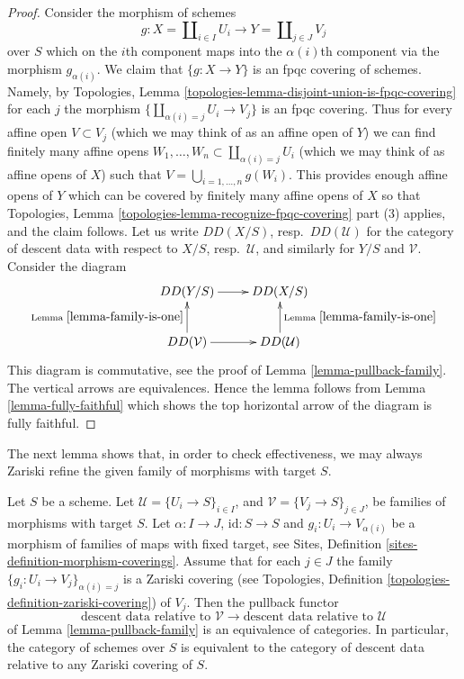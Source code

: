 \begin{proof}
Consider the morphism of schemes
$$
g :
X = \coprod\nolimits_{i \in I} U_i
\longrightarrow
Y = \coprod\nolimits_{j \in J} V_j
$$
over $S$ which on the $i$th component maps into the $\alpha(i)$th component
via the morphism $g_{\alpha(i)}$. We claim that $\{g : X \to Y\}$
is an fpqc covering of schemes. Namely, by
Topologies, Lemma \ref{topologies-lemma-disjoint-union-is-fpqc-covering}
for each $j$ the morphism $\{\coprod_{\alpha(i) = j} U_i \to V_j\}$ is an
fpqc covering. Thus for every affine open $V \subset V_j$
(which we may think of as an affine open of $Y$)
we can find finitely many affine opens
$W_1, \ldots, W_n \subset \coprod_{\alpha(i) = j} U_i$
(which we may think of as affine opens of $X$)
such that $V = \bigcup_{i = 1, \ldots, n} g(W_i)$.
This provides enough affine opens of $Y$ which can be covered by finitely
many affine opens of $X$ so that
Topologies, Lemma \ref{topologies-lemma-recognize-fpqc-covering} part (3)
applies, and the claim follows. Let us write $DD(X/S)$,
resp.\ $DD(\mathcal{U})$ for the category of descent data with respect
to $X/S$, resp.\ $\mathcal{U}$, and similarly for $Y/S$ and $\mathcal{V}$.
Consider the diagram
$$
\xymatrix{
DD(Y/S) \ar[r] & DD(X/S) \\
DD(\mathcal{V}) \ar[u]^{\text{Lemma }\ref{lemma-family-is-one}} \ar[r] &
DD(\mathcal{U}) \ar[u]_{\text{Lemma }\ref{lemma-family-is-one}}
}
$$
This diagram is commutative, see the proof of
Lemma \ref{lemma-pullback-family}.
The vertical arrows are equivalences. Hence the lemma follows from
Lemma \ref{lemma-fully-faithful} which shows the top horizontal arrow
of the diagram is fully faithful.
\end{proof}

\noindent
The next lemma shows that, in order to check effectiveness,
we may always Zariski refine the given family of morphisms
with target $S$.

\begin{lemma}
\label{lemma-Zariski-refinement-coverings-equivalence}
Let $S$ be a scheme.
Let $\mathcal{U} = \{U_i \to S\}_{i \in I}$, and
$\mathcal{V} = \{V_j \to S\}_{j \in J}$,
be families of morphisms with target $S$.
Let $\alpha : I \to J$, $\text{id} : S \to S$ and
$g_i : U_i \to V_{\alpha(i)}$ be a morphism of families
of maps with fixed target, see
Sites, Definition \ref{sites-definition-morphism-coverings}.
Assume that for each $j \in J$ the family
$\{g_i : U_i \to V_j\}_{\alpha(i) = j}$ is a Zariski covering (see
Topologies, Definition \ref{topologies-definition-zariski-covering})
of $V_j$. Then the pullback functor
$$
\text{descent data relative to }
\mathcal{V}
\longrightarrow
\text{descent data relative to }
\mathcal{U}
$$
of Lemma \ref{lemma-pullback-family} is an equivalence of categories.
In particular, the category of schemes over $S$
is equivalent to the category
of descent data relative to any Zariski covering of $S$.
\end{lemma}


